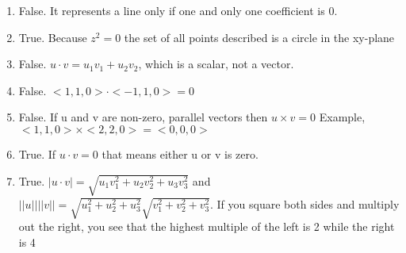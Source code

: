 \documentclass{article}%
\begin{document}
\begin{enumerate}
\item%
False.  It represents a line only if one and only one coefficient is 0.%
\item%
True.  Because $z^2=0$ the set of all points described is a circle in the xy-plane%
\item%
False.  $u \cdot v = u_1 v_1 + u_2 v_2$, which is a scalar, not a vector.%
\item%
False.  $<1,1,0> \cdot <-1,1,0> = 0$%
\item%
False.  If u and v are non-zero, parallel vectors then $u \times v = 0$  Example, $<1,1,0> \times <2,2,0> = <0,0,0>$%
\item%
True.  If $u \cdot v = 0$ that means either u or v is zero.%
\item%
True. $|u \cdot v| = \sqrt{u_1 v_1^2 + u_2 v_2^2 + u_3 v_3^2}$                     and $||u|| ||v|| = \sqrt{u_1^2+u_2^2+u_3^2}\sqrt{v_1^2+v_2^2+v_3^2}$.  If you square                     both sides and multiply out the right, you see that the highest multiple of the left is 2 while the right is 4%
\end{enumerate}

%
\end{document}
